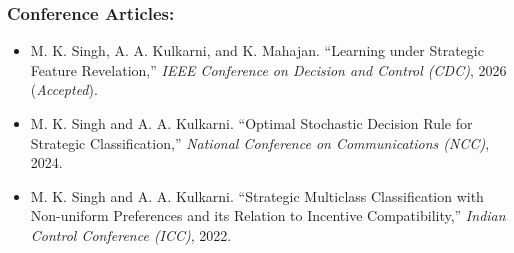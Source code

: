 \subsubsection*{Conference Articles:}
\begin{itemize}[leftmargin=*,noitemsep,topsep=2pt]
\item[\(1.\)] M. K. Singh, A. A. Kulkarni, and K. Mahajan. ``Learning under Strategic Feature Revelation,'' \emph{IEEE Conference on Decision and Control (CDC)}, 2026 (\emph{Accepted}).
\item[\(2.\)] M. K. Singh and A. A. Kulkarni. ``Optimal Stochastic Decision Rule for Strategic Classification,'' \emph{National Conference on Communications (NCC)}, 2024.
\item[\(3.\)] M. K. Singh and A. A. Kulkarni. ``Strategic Multiclass Classification with Non-uniform Preferences and its Relation to Incentive Compatibility,'' \emph{Indian Control Conference (ICC)}, 2022.
\end{itemize}
